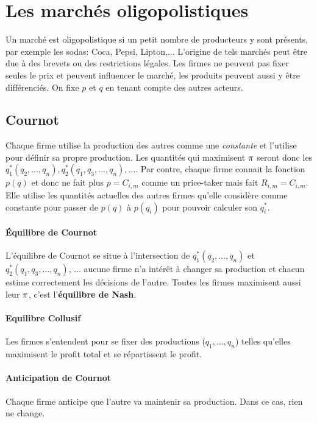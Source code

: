 \section{Les marchés oligopolistiques}
Un marché est oligopolistique si un
petit nombre de producteurs y sont présents,
par exemple les sodas: Coca, Pepsi, Lipton,...
L'origine de tels marchés peut être due à
des brevets ou des restrictions légales.
Les firmes ne peuvent pas fixer seules le prix et peuvent influencer le marché,
les produits peuvent aussi y être différenciés.
On fixe $p$ et $q$ en tenant compte des autres acteurs.

\subsection{Cournot}
Chaque firme utilise la production des autres comme une \emph{constante}
et l'utilise pour définir sa propre production.
Les quantités qui maximisent $\pi$ seront
donc les $q_1^*(q_2, \ldots, q_n), q_2^*(q_1, q_3, \ldots, q_n),\ldots$.
Par contre, chaque firme connait la fonction $p(q)$ et donc ne fait
plus $p = C_{i,m}$ comme un price-taker mais fait $R_{i,m} = C_{i,m}$.
Elle utilise les quantités actuelles des autres firmes qu'elle
considère comme constante pour passer de $p(q)$ à $p(q_i)$
pour pouvoir calculer son $q_i^*$.

\paragraph{Équilibre de Cournot}
L'équilibre de Cournot se situe à l'intersection
de $q_1^*(q_2, \ldots, q_n)$ et $q_2^*(q_1, q_3, \ldots, q_n)$, ...
aucune firme n'a intérêt à changer sa production et chacun estime correctement
les décisions de l'autre.
Toutes les firmes maximisent aussi leur $\pi$,
c'est l'\textbf{équilibre de Nash}.

\paragraph{Equilibre Collusif}
Les firmes s'entendent pour se fixer des productions ($q_1,...,q_n$) telles
qu'elles maximisent le profit total et se répartissent le profit.

\paragraph{Anticipation de Cournot}
Chaque firme anticipe que l'autre va maintenir sa production.
Dans ce cas, rien ne change.

